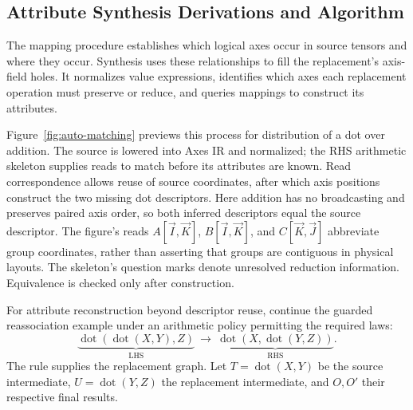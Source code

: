 \FloatBarrier
\subsection{Attribute Synthesis Derivations and Algorithm}
\label{app:synthesis}
The mapping procedure establishes which logical axes occur in source tensors
and where they occur. Synthesis uses these relationships to fill the
replacement's axis-field holes. It normalizes value expressions, identifies
which axes each replacement operation must preserve or reduce, and queries
mappings to construct its attributes.

Figure~\ref{fig:auto-matching} previews this process for distribution of a dot
over addition. The source is lowered into Axes IR and normalized; the RHS
arithmetic skeleton supplies reads to match before its attributes are known.
Read correspondence allows reuse of source coordinates, after which axis
positions construct the two missing dot descriptors. Here addition has no
broadcasting and preserves paired axis order, so both inferred descriptors
equal the source descriptor. The figure's reads $A[\vec I,\vec K]$, $B[\vec I,\vec K]$, and
$C[\vec K,\vec J]$ abbreviate group coordinates, rather than asserting that groups are
contiguous in physical layouts. The skeleton's question marks denote unresolved
reduction information. Equivalence is checked only after construction.

\FloatBarrier



For attribute reconstruction beyond descriptor reuse, continue the guarded
reassociation example under an arithmetic policy permitting the required laws:
\begin{equation}
 \underbrace{\operatorname{dot}(\operatorname{dot}(X,Y),Z)}_{\mathrm{LHS}}
 \ \longrightarrow\
 \underbrace{\operatorname{dot}(X,\operatorname{dot}(Y,Z))}_{\mathrm{RHS}}.
\end{equation}
The rule supplies the replacement graph. Let $T=\operatorname{dot}(X,Y)$ be
the source intermediate, $U=\operatorname{dot}(Y,Z)$ the replacement
intermediate, and $O,O'$ their respective final results.


